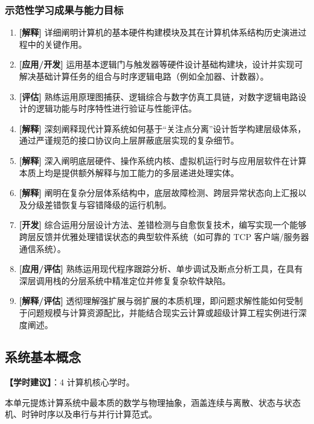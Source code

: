 \subsubsection{示范性学习成果与能力目标}
\begin{enumerate}
    \item \textbf{[解释]} 详细阐明计算机的基本硬件构建模块及其在计算机体系结构历史演进过程中的关键作用。
    \item \textbf{[应用/开发]} 运用基本逻辑门与触发器等硬件设计基础构建块，设计并实现可解决基础计算任务的组合与时序逻辑电路（例如全加器、计数器）。
    \item \textbf{[评估]} 熟练运用原理图捕获、逻辑综合与数字仿真工具链，对数字逻辑电路设计的逻辑功能与时序特性进行验证与性能评估。
    \item \textbf{[解释]} 深刻阐释现代计算系统如何基于“关注点分离”设计哲学构建层级体系，通过严谨规范的接口协议向上层屏蔽底层实现的复杂细节。
    \item \textbf{[解释]} 深入阐明底层硬件、操作系统内核、虚拟机运行时与应用层软件在计算本质上均是提供额外解释与加工能力的多层递进处理实体。
    \item \textbf{[解释]} 阐明在复杂分层体系结构中，底层故障检测、跨层异常状态向上汇报以及分级差错恢复与容错降级的运行机制。
    \item \textbf{[开发]} 综合运用分层设计方法、差错检测与自愈恢复技术，编写实现一个能够跨层反馈并优雅处理错误状态的典型软件系统（如可靠的 TCP 客户端/服务器通信系统）。
    \item \textbf{[应用/评估]} 熟练运用现代程序跟踪分析、单步调试及断点分析工具，在具有深层调用栈的分层系统中精准定位并修复复杂软件缺陷。
    \item \textbf{[解释/评估]} 透彻理解强扩展与弱扩展的本质机理，即问题求解性能如何受制于问题规模与计算资源配比，并能结合现实云计算或超级计算工程实例进行深度阐述。
\end{enumerate}

\subsection{系统基本概念}
\textbf{【学时建议】}：4 计算机核心学时。

本单元提炼计算系统中最本质的数学与物理抽象，涵盖连续与离散、状态与状态机、时钟时序以及串行与并行计算范式。

